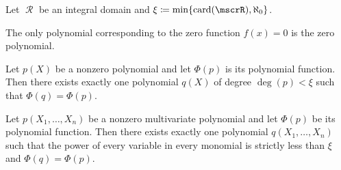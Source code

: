 \begin{theorem}\label{thm:polynomial_embedding_behavior}
  Let \( \mscrR \) be an integral domain and \( \xi \coloneqq \min \{ \card(\mscrR), \aleph_0 \} \).

  \begin{thmenum}
     The only polynomial corresponding to the zero function \( f(x) = 0 \) is the zero polynomial.

     Let \( p(X) \) be a nonzero polynomial and let \( \Phi(p) \) is its polynomial function. Then there exists exactly one polynomial \( q(X) \) of degree \( \deg(p) < \xi \) such that \( \Phi(q) = \Phi(p) \).

     Let \( p(X_1, \ldots, X_n) \) be a nonzero multivariate polynomial and let \( \Phi(p) \) be its polynomial function. Then there exists exactly one polynomial \( q(X_1, \ldots, X_n) \) such that the power of every variable in every monomial is strictly less than \( \xi \) and \( \Phi(q) = \Phi(p) \).
  \end{thmenum}
\end{theorem}
